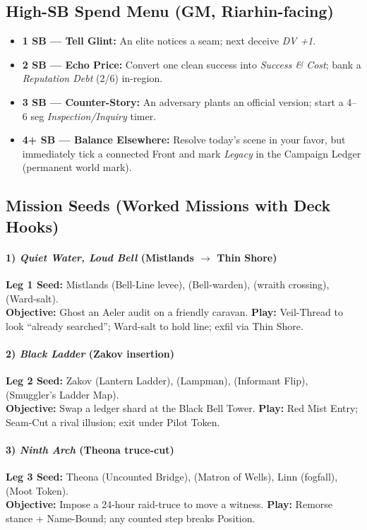\subsection{High-SB Spend Menu (GM, Riarhin-facing)}
\begin{itemize}
  \item \textbf{1 SB --- Tell Glint:} An elite notices a seam; next deceive \emph{DV +1}.
  \item \textbf{2 SB --- Echo Price:} Convert one clean success into \emph{Success \& Cost}; bank a \emph{Reputation Debt} (2/6) in-region.
  \item \textbf{3 SB --- Counter-Story:} An adversary plants an official version; start a 4--6 seg \emph{Inspection/Inquiry} timer.
  \item \textbf{4+ SB --- Balance Elsewhere:} Resolve today's scene in your favor, but immediately tick a connected Front and mark \emph{Legacy} in the Campaign Ledger (permanent world mark).
\end{itemize}

\subsection{Mission Seeds (Worked Missions with Deck Hooks)}
\paragraph{1) \emph{Quiet Water, Loud Bell} (Mistlands $\to$ Thin Shore)}
\textbf{Leg 1 Seed:} Mistlands \SuitSpade{} (Bell-Line levee), \SuitHeart{} (Bell-warden), \SuitClub{} (wraith crossing), \SuitDiamond{} (Ward-salt). \\
\textbf{Objective:} Ghost an Aeler audit on a friendly caravan. \textbf{Play:} Veil-Thread to look ``already searched''; Ward-salt to hold line; exfil via Thin Shore.

\paragraph{2) \emph{Black Ladder} (Zakov insertion)}
\textbf{Leg 2 Seed:} Zakov \SuitSpade{} (Lantern Ladder), \SuitHeart{} (Lampman), \SuitClub{} (Informant Flip), \SuitDiamond{} (Smuggler's Ladder Map). \\
\textbf{Objective:} Swap a ledger shard at the Black Bell Tower. \textbf{Play:} Red Mist Entry; Seam-Cut a rival illusion; exit under Pilot Token.

\paragraph{3) \emph{Ninth Arch} (Theona truce-cut)}
\textbf{Leg 3 Seed:} Theona \SuitSpade{} (Uncounted Bridge), \SuitHeart{} (Matron of Wells), Linn \SuitClub{} (fogfall), \SuitDiamond{} (Moot Token). \\
\textbf{Objective:} Impose a 24-hour raid-truce to move a witness. \textbf{Play:} Remorse stance + Name-Bound; any counted step breaks Position.

